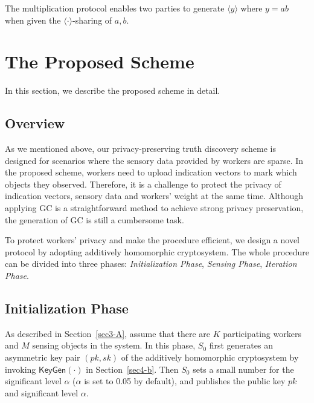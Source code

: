 \documentclass[conference]{IEEEtran}
\begin{document}
The multiplication protocol enables two parties to generate $\langle y \rangle$ where $y = ab$ when given the $\langle \cdot \rangle$-sharing of $a,b$.
\fi


\section{The Proposed Scheme}\label{sec5}

In this section, we describe the proposed scheme in detail.

\subsection{Overview}

As we mentioned above, our privacy-preserving truth discovery scheme is designed for scenarios where the sensory data provided by workers are sparse.
In the proposed scheme, workers need to upload indication vectors to mark which objects they observed.
Therefore, it is a challenge to protect the privacy of indication vectors, sensory data and workers' weight at the same time.
Although applying GC is a straightforward method to achieve strong privacy preservation, the generation of GC is still a cumbersome task.

To protect workers' privacy and make the procedure efficient, we design a novel protocol by adopting additively homomorphic cryptosystem.
The whole procedure can be divided into three phases: {\em Initialization Phase}, {\em Sensing Phase}, {\em Iteration Phase}.

\subsection{Initialization Phase}

As described in Section~\ref{sec3-A}, assume that there are $K$ participating workers and $M$ sensing objects in the system.
In this phase, $S_0$ first generates an asymmetric key pair $(pk, sk)$ of the additively homomorphic cryptosystem by invoking $\mathsf{KeyGen}(\cdot)$ in Section~\ref{sec4-b}.
Then $S_0$ sets a small number for the significant level $\alpha$ ($\alpha$ is set to 0.05 by default), and publishes the public key $pk$ and significant level $\alpha$.

\end{document}
